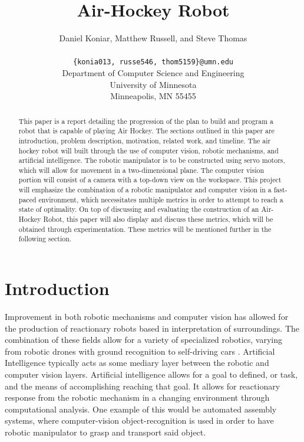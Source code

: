 \documentclass[letterpaper, 10 pt, conference]{ieeeconf}
\title{\bf
Air-Hockey Robot
}
\author{\parbox{5 in}{\centering Daniel Koniar, Matthew Russell, and Steve Thomas}\\
  {\tt\small \{konia013, russe546, thom5159\}@umn.edu}\\
  Department of Computer Science and Engineering\\
  University of Minnesota\\
  Minneapolis, MN 55455\\
}
\begin{document}
\maketitle
\thispagestyle{empty}
\pagestyle{empty}

\begin{abstract}
This paper is a report detailing the progression of the plan to build and program a robot that is capable of playing Air Hockey.  The sections outlined in this paper are introduction, problem description, motivation, related work, and timeline.  The air hockey robot will built through the use of computer vision, robotic mechanisms, and artificial intelligence. The robotic manipulator is to be constructed using servo motors, which will allow for movement in a two-dimensional plane.  The computer vision portion will consist of a camera with a top-down view on the workspace.  This project will emphasize the combination of a robotic manipulator and computer vision in a fast-paced environment, which necessitates multiple metrics in order to attempt to reach a state of optimality.  On top of discussing and evaluating the construction of an Air-Hockey Robot, this paper will also display and discuss these metrics, which will be obtained through experimentation.  These metrics will be mentioned further in the following section.
\end{abstract}

\section{Introduction}
\label{introduction}
Improvement in both robotic mechanisms and computer vision has allowed for the production of reactionary robots based in interpretation of surroundings.  The combination of these fields allow for a variety of specialized robotics, varying from robotic drones \cite{3dr} with ground recognition to self-driving cars \cite{googlecar}.  Artificial Intelligence  typically acts as some mediary layer between the robotic and computer vision layers.  Artificial intelligence allows for a goal to defined, or task, and the means of accomplishing reaching that goal.  It allows for reactionary response from the robotic mechanism in a changing environment through computational analysis.  One example of this would be automated assembly systems, where computer-vision object-recognition is used in order to have robotic manipulator to grasp and transport said object.
\end{document}
